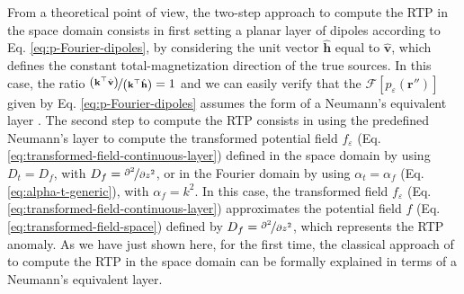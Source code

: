 From a theoretical point of view, the two-step approach to compute the RTP in the space domain 
consists in first setting a planar layer of dipoles according to Eq. \ref{eq:p-Fourier-dipoles}, 
by considering the unit vector $\hat{\mathbf{h}}$ equal to $\hat{\mathbf{v}}$, which defines 
the constant total-magnetization direction of the true sources.
In this case, the ratio $\nicefrac{\left(\mathbf{k}^{\top} \hat{\mathbf{v}} \right)}{\left(\mathbf{k}^{\top} \hat{\mathbf{h}} \right)} = 1$ 
and we can easily verify that the $\mathcal{F} [ p_{\varepsilon}(\mathbf{r}'') ]$ given by 
Eq. \ref{eq:p-Fourier-dipoles} assumes the form of a Neumann's equivalent layer \cite{oliveirajr_etal2026_1}.
The second step to compute the RTP consists in using the predefined Neumann's layer to compute 
the transformed potential field $f_{\varepsilon}$ (Eq. \ref{eq:transformed-field-continuous-layer}) defined in the 
space domain by using $D_{t} = D_{f}$, with $D_{f} = \nicefrac{\partial^{2}}{\partial z^{2}}$, or in the Fourier domain 
by using $\alpha_{t} = \alpha_{f}$ (Eq. \ref{eq:alpha-t-generic}), with 
$\alpha_{f} = k^{2}$.
In this case, the transformed field $f_{\varepsilon}$ (Eq. \ref{eq:transformed-field-continuous-layer}) 
approximates the potential field $f$ (Eq. \ref{eq:transformed-field-space}) defined by 
$D_{f} = \nicefrac{\partial^{2}}{\partial z^{2}}$, which represents the RTP anomaly. 
As we have just shown here, for the first time, the classical approach of \cite{silva1986} to compute the RTP in the 
space domain can be formally explained in terms of a Neumann's equivalent layer. 

